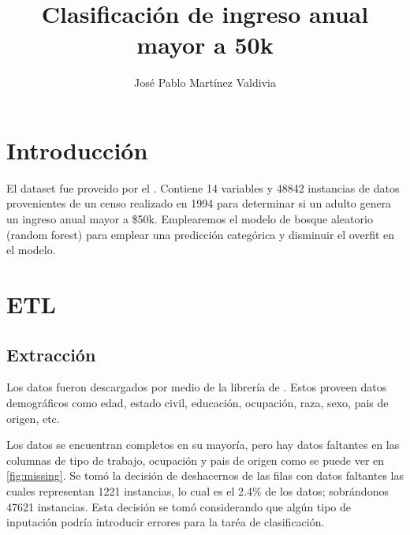 \documentclass[twocolumn]{article}
\title{Clasificación de ingreso anual mayor a 50k}
\author{José Pablo Martínez Valdivia}
\begin{document}


\section{Introducción}
El dataset  fue proveido por el .
Contiene 14 variables y 48842 instancias de datos provenientes de un censo realizado
en 1994 para determinar si un adulto genera un ingreso anual mayor a \$50k.
Emplearemos el modelo de bosque aleatorio (random forest) para emplear una predicción 
categórica y disminuir el overfit en el modelo.

\section{ETL}
\subsection{Extracción}
Los datos fueron descargados por medio de la librería de .
Estos proveen datos demográficos como edad, estado civil, educación, ocupación, raza,
sexo, pais de origen, etc.

Los datos se encuentran completos en su mayoría, pero hay datos faltantes en 
las columnas de tipo de trabajo, ocupación y pais de origen como se puede ver en
\ref{fig:missing}. Se tomó la decisión de deshacernos de las filas con datos faltantes
las cuales representan 1221 instancias, lo cual es el 2.4\% de los datos; sobrándonos
47621 instancias. Esta decisión se tomó considerando que algún tipo de inputación 
podría introducir errores para la taréa de clasificación.
\end{document}
